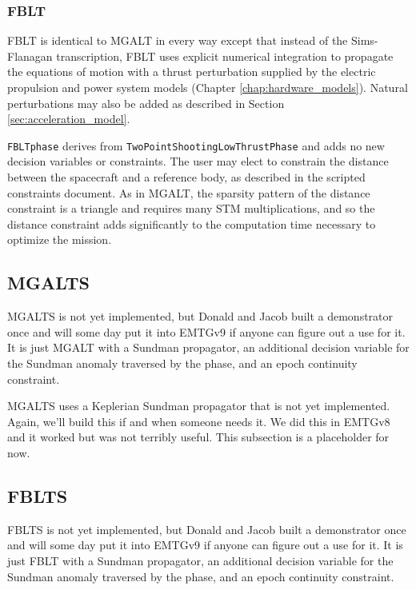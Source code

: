 \subsubsection{FBLT}
\label{subsubsec:FBLT}

\ac{FBLT} is identical to \ac{MGALT} in every way except that instead of the Sims-Flanagan transcription, \ac{FBLT} uses explicit numerical integration to propagate the equations of motion with a thrust perturbation supplied by the electric propulsion and power system models (Chapter \ref{chap:hardware_models}). Natural perturbations may also be added as described in Section \ref{sec:acceleration_model}.

\texttt{FBLTphase} derives from \texttt{TwoPointShootingLowThrustPhase} and adds no new decision variables or constraints. The user may elect to constrain the distance between the spacecraft and a reference body, as described in the scripted constraints document. As in \ac{MGALT}, the sparsity pattern of the distance constraint is a triangle and requires many \ac{STM} multiplications, and so the distance constraint adds significantly to the computation time necessary to optimize the mission.

\subsection{MGALTS}
\label{subsec:MGALTS}

\ac{MGALTS} is not yet implemented, but Donald and Jacob built a demonstrator once and will some day put it into EMTGv9 if anyone can figure out a use for it. It is just MGALT with a Sundman propagator, an additional decision variable for the Sundman anomaly traversed by the phase, and an epoch continuity constraint.

MGALTS uses a Keplerian Sundman propagator that is not yet implemented. Again, we'll build this if and when someone needs it. We did this in EMTGv8 and it worked but was not terribly useful. This subsection is a placeholder for now.

\subsection{FBLTS}
\label{subsec:FBLTS}

\ac{FBLTS} is not yet implemented, but Donald and Jacob built a demonstrator once and will some day put it into EMTGv9 if anyone can figure out a use for it. It is just FBLT with a Sundman propagator, an additional decision variable for the Sundman anomaly traversed by the phase, and an epoch continuity constraint.

